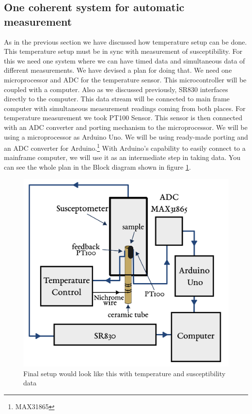 \subsection{One coherent system for automatic measurement}
 As in the previous section we have discussed how temperature setup can be done. This temperature setup must be in sync with measurement of susceptibility. For this we need one system where we can have timed data and simultaneous data of different measurements. We have devised a plan for doing that. We need one microprocessor and ADC for the temperature sensor. This microcontroller will be coupled with a computer. Also as we discussed previously, SR830 interfaces directly to the computer. This data stream will be connected to main frame computer with simultaneous measurement readings coming from both places.
For temperature measurement we took PT100 Sensor. This sensor is then connected with an ADC converter and porting mechanism to the microprocessor. We will be using a microprocessor as Arduino Uno. We will be using ready-made porting and an ADC converter for Arduino.\footnote{MAX31865} With Arduino’s capability to easily connect to a mainframe computer, we will use it as an intermediate step in taking data. You can see the whole plan in the Block diagram shown in figure \ref{fig:setupimage}.

\begin{figure}[hbt!]
  \includegraphics[width= \linewidth]{setup.png}
  \caption{Final setup would look like this with temperature and susceptibility data}
  \label{fig:setupimage}
\end{figure}

